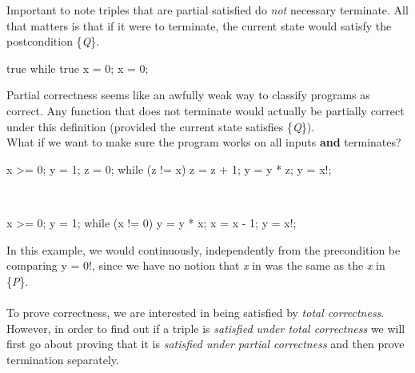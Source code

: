 Important to note triples that are partial satisfied do \emph{not} necessary terminate.  All that matters is that if it were to terminate, the current state would satisfy the postcondition \{\emph{Q}\}.\\

\begin{code}[C]
{true}
while true {x = 0;}
{x = 0;}
\end{code}

Partial correctness seems like an awfully weak way to classify programs as correct.  Any function that does not terminate would actually be partially correct under this definition (provided the current state satisfies \{\emph{Q}\}).\\

What if we want to make sure the program works on all inputs \textbf{and} terminates?\\


\begin{code}[C]
{x >= 0;}
y = 1;
z = 0;
while (z != x) {
		z = z + 1;
		y = y * z;
}
{y = x!;}
\end{code}
\\
\begin{code}[C]
{x >= 0;}
y = 1;
while (x != 0) {
		y = y * x;
		x = x - 1;
}
{y = x!;}
\end{code}
In this example, we would continuously, independently from the precondition be comparing y = 0!, since we have no notion that \emph{x} in  was the same as the \emph{x} in \{\emph{P}\}.\\
\\ 
To prove correctness, we are interested in being satisfied by \emph{total correctness}.  However, in order to find out if a triple is \emph{satisfied under total correctness} we will first go about proving that it is \emph{satisfied under partial correctness} and then prove termination separately.\\


